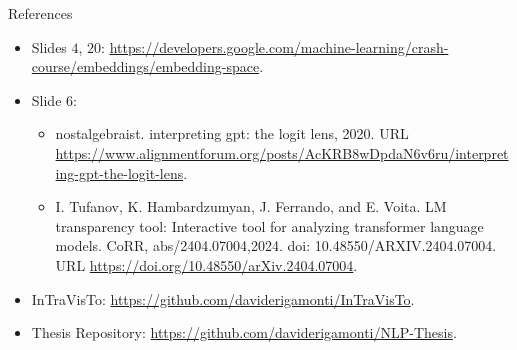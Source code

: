 \documentclass[aspectratio=169, 12pt, compress]{beamer}
\begin{document}
    \begin{frame}{References}
        \footnotesize
        \begin{itemize}
            \item Slides $4$, $20$: \url{https://developers.google.com/machine-learning/crash-course/embeddings/embedding-space}.
            \item Slide $6$:
            \begin{itemize}
                \item nostalgebraist. interpreting gpt: the logit lens, 2020. URL \url{https://www.alignmentforum.org/posts/AcKRB8wDpdaN6v6ru/interpreting-gpt-the-logit-lens}.
                \item I. Tufanov, K. Hambardzumyan, J. Ferrando, and E. Voita. LM transparency tool: Interactive tool for analyzing transformer language models. CoRR, abs/2404.07004,2024. doi: 10.48550/ARXIV.2404.07004. URL \url{https://doi.org/10.48550/arXiv.2404.07004}.
            \end{itemize}
            \item InTraVisTo: \url{https://github.com/daviderigamonti/InTraVisTo}.
            \item Thesis Repository: \url{https://github.com/daviderigamonti/NLP-Thesis}.
        \end{itemize}
    \end{frame}
\end{document}
